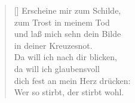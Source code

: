 \begin{multicols}{2}
\begin{verse}[\versewidth]
 Erscheine mir zum Schilde,\\
zum Trost in meinem Tod\\
und laß mich sehn dein Bilde\\
in deiner Kreuzesnot.\\
Da will ich nach dir blicken,\\
da will ich glaubensvoll\\
dich fest an mein Herz drücken:\\
Wer so stirbt, der stirbt wohl.

\end{verse}
\end{multicols}
